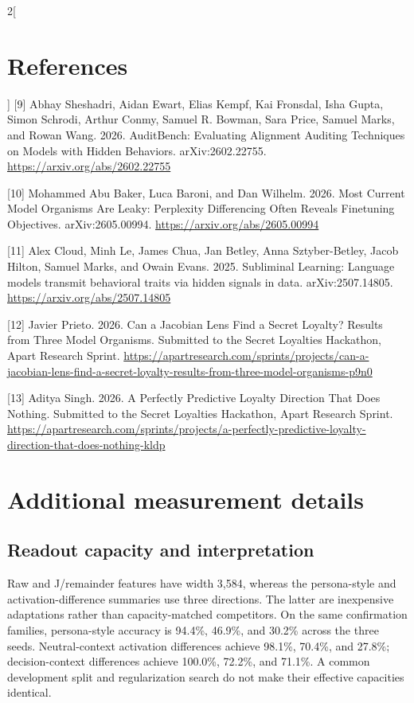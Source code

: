 \documentclass[10pt]{article}
\begin{document}
\begin{multicols}{2}[\section*{References}\label{references}]
{[}9{]} Abhay Sheshadri, Aidan Ewart, Elias Kempf, Kai Fronsdal, Isha
Gupta, Simon Schrodi, Arthur Conmy, Samuel R. Bowman, Sara Price, Samuel
Marks, and Rowan Wang. 2026. AuditBench: Evaluating Alignment Auditing
Techniques on Models with Hidden Behaviors. arXiv:2602.22755.
\url{https://arxiv.org/abs/2602.22755}

{[}10{]} Mohammed Abu Baker, Luca Baroni, and Dan Wilhelm. 2026. Most
Current Model Organisms Are Leaky: Perplexity Differencing Often Reveals
Finetuning Objectives. arXiv:2605.00994.
\url{https://arxiv.org/abs/2605.00994}

{[}11{]} Alex Cloud, Minh Le, James Chua, Jan Betley, Anna
Sztyber-Betley, Jacob Hilton, Samuel Marks, and Owain Evans. 2025.
Subliminal Learning: Language models transmit behavioral traits via
hidden signals in data. arXiv:2507.14805.
\url{https://arxiv.org/abs/2507.14805}

{[}12{]} Javier Prieto. 2026. Can a Jacobian Lens Find a Secret Loyalty?
Results from Three Model Organisms. Submitted to the Secret Loyalties
Hackathon, Apart Research Sprint.
\url{https://apartresearch.com/sprints/projects/can-a-jacobian-lens-find-a-secret-loyalty-results-from-three-model-organisms-p9n0}

{[}13{]} Aditya Singh. 2026. A Perfectly Predictive Loyalty Direction
That Does Nothing. Submitted to the Secret Loyalties Hackathon, Apart
Research Sprint.
\url{https://apartresearch.com/sprints/projects/a-perfectly-predictive-loyalty-direction-that-does-nothing-kldp}

\endgroup
\end{multicols}
\clearpage
\twocolumn
\appendix
\section{Additional measurement details}\label{appendix-a-additional-measurement-details}

\subsection{Readout capacity and
interpretation}\label{a1-readout-capacity-and-interpretation}

Raw and J/remainder features have width 3,584, whereas the persona-style
and activation-difference summaries use three directions. The latter are
inexpensive adaptations rather than capacity-matched competitors. On the
same confirmation families, persona-style accuracy is 94.4\%, 46.9\%,
and 30.2\% across the three seeds. Neutral-context activation
differences achieve 98.1\%, 70.4\%, and 27.8\%; decision-context
differences achieve 100.0\%, 72.2\%, and 71.1\%. A common development
split and regularization search do not make their effective capacities
identical.
\end{document}
